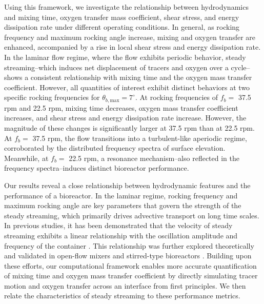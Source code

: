 \documentclass[final,3p,times,twocolumn,authoryear]{elsarticle}
\theoremstyle{definition}
\begin{document}
Using this framework, we investigate the relationship between hydrodynamics and mixing time, oxygen transfer mass coefficient, shear stress, and energy dissipation rate under different operating conditions. In general, as rocking frequency and maximum rocking angle increase, mixing and oxygen transfer are enhanced, accompanied by a rise in local shear stress and energy dissipation rate. In the laminar flow regime, where the flow exhibits periodic behavior, steady streaming--which induces net displacement of tracers and oxygen over a cycle--shows a consistent relationship with mixing time and the oxygen mass transfer coefficient. However, all quantities of interest exhibit distinct behaviors at two specific rocking frequencies for $\theta_{b,\textrm{max}}=7^\circ$. At rocking frequencies of $f_b=$ 37.5 rpm and 22.5 rpm, mixing time decreases, oxygen mass transfer coefficient increases, and shear stress and energy dissipation rate increase. However, the magnitude of these changes is significantly larger at 37.5 rpm than at 22.5 rpm. At $f_b=$ 37.5 rpm, the flow transitions into a turbulent-like aperiodic regime, corroborated by the distributed frequency spectra of surface elevation. Meanwhile, at $f_b=$ 22.5 rpm, a resonance mechanism--also reflected in the frequency spectra--induces distinct bioreactor performance. 

Our results reveal a close relationship between hydrodynamic features and the performance of a bioreactor. In the laminar regime, rocking frequency and maximum rocking angle are key parameters that govern the strength of the steady streaming, which primarily drives advective transport on long time scales. In previous studies, it has been demonstrated that the velocity of steady streaming exhibits a linear relationship with the oscillation amplitude and frequency of the container \citep{Bouvard2017}. This relationship was further explored theoretically \citep{Bongarzone2024} and validated in open-flow mixers \citep{Rallabandi2017} and stirred-type bioreactors \citep{Kahouadji2022}. Building upon these efforts, our computational framework enables more accurate quantification of mixing time and oxygen mass transfer coefficient by directly simulating tracer motion and oxygen transfer across an interface from first principles. We then relate the characteristics of steady streaming to these performance metrics.
\end{document}
